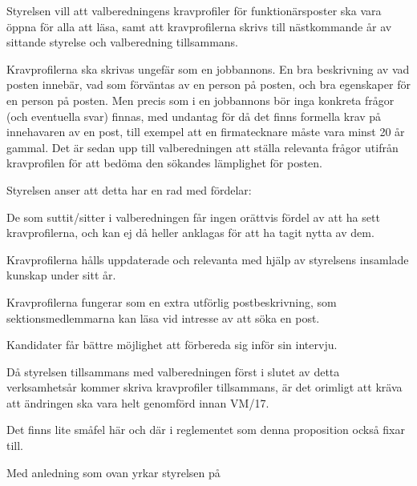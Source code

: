 \documentclass[../_main/handlingar.tex]{subfiles}
\begin{document}

Styrelsen vill att valberedningens kravprofiler för funktionärsposter ska vara öppna för alla att läsa, samt att kravprofilerna skrivs till nästkommande år av sittande styrelse och valberedning tillsammans.

Kravprofilerna ska skrivas ungefär som en jobbannons. En bra beskrivning av vad posten innebär, vad som förväntas av en person på posten, och bra egenskaper för en person på posten. Men precis som i en jobbannons bör inga konkreta frågor (och eventuella svar) finnas, med undantag för då det finns formella krav på innehavaren av en post, till exempel att en firmatecknare måste vara minst 20 år gammal. Det är sedan upp till valberedningen att ställa relevanta frågor utifrån kravprofilen för att bedöma den sökandes lämplighet för posten.

Styrelsen anser att detta har en rad med fördelar:
\begin{dashlist}
    \item De som suttit/sitter i valberedningen får ingen orättvis fördel av att ha sett kravprofilerna, och kan ej då heller anklagas för att ha tagit nytta av dem.
    \item Kravprofilerna hålls uppdaterade och relevanta med hjälp av styrelsens insamlade kunskap under sitt år.
    \item Kravprofilerna fungerar som en extra utförlig postbeskrivning, som sektionsmedlemmarna kan läsa vid intresse av att söka en post.
    \item Kandidater får bättre möjlighet att förbereda sig inför sin intervju.
\end{dashlist}

Då styrelsen tillsammans med valberedningen först i slutet av detta verksamhetsår kommer skriva kravprofiler tillsammans, är det orimligt att kräva att ändringen ska vara helt genomförd innan VM/17.

Det finns lite småfel här och där i reglementet som denna proposition också fixar till.

Med anledning som ovan yrkar styrelsen på
\end{document}
